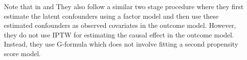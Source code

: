 Note that in \cite{bicaTimeSeriesDeconfounder2020} and \cite{wangBlessingsMultipleCauses2019} 
They also follow a similar two stage procedure where they first estimate the latent confounders
using a factor model and then use these estimated confounders as observed covariates in the outcome model. 
However, they do not use IPTW for estimating the causal effect in the outcome model. 
Instead, they use G-formula which does not involve fitting a second propensity score model.

